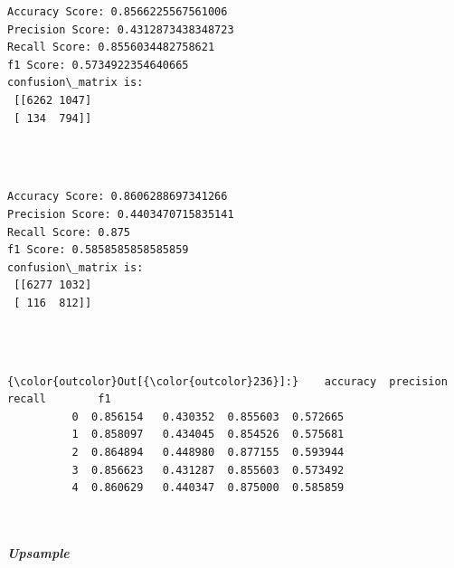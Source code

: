 \documentclass[11pt]{article}
\begin{document}
    \begin{Verbatim}[commandchars=\\\{\}]
Accuracy Score: 0.8566225567561006
Precision Score: 0.4312873438348723
Recall Score: 0.8556034482758621
f1 Score: 0.5734922354640665
confusion\_matrix is: 
 [[6262 1047]
 [ 134  794]] 


    \end{Verbatim}

   

    \begin{center}
    \end{center}
    { \hspace*{\fill} \\}
    
    \begin{Verbatim}[commandchars=\\\{\}]
Accuracy Score: 0.8606288697341266
Precision Score: 0.4403470715835141
Recall Score: 0.875
f1 Score: 0.5858585858585859
confusion\_matrix is: 
 [[6277 1032]
 [ 116  812]] 


    \end{Verbatim}

  

    \begin{center}
    \end{center}
    { \hspace*{\fill} \\}
    
\begin{Verbatim}[commandchars=\\\{\}]
{\color{outcolor}Out[{\color{outcolor}236}]:}    accuracy  precision    recall        f1
          0  0.856154   0.430352  0.855603  0.572665
          1  0.858097   0.434045  0.854526  0.575681
          2  0.864894   0.448980  0.877155  0.593944
          3  0.856623   0.431287  0.855603  0.573492
          4  0.860629   0.440347  0.875000  0.585859
\end{Verbatim}
            
    \begin{center}
    \end{center}
    { \hspace*{\fill} \\}
    
    \subparagraph{Upsample}\label{upsample}
\end{document}
